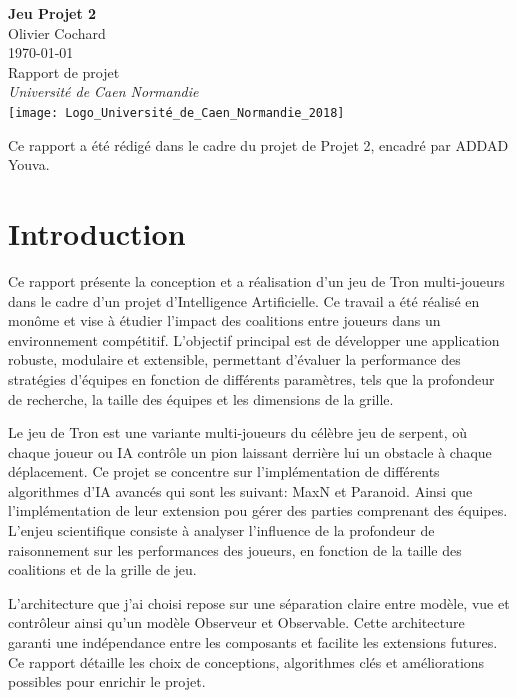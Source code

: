 \documentclass[a4paper,12pt]{article}
\begin{document}
	\begin{titlepage}
		\centering
		{\Huge \textbf{Jeu Projet 2}} \\[1.5cm]
		Olivier Cochard \\
		\today \\[2cm]
		
		
		
		
		{\Large Rapport de projet} \\[0.5cm]
		{\large \textit{Université de Caen Normandie}} \\[2cm]
		\texttt{[image: Logo\_Université\_de\_Caen\_Normandie\_2018]}
		
		
		
		\vfill
		{\small Ce rapport a été rédigé dans le cadre du projet de Projet 2, encadré par ADDAD Youva.}
	\end{titlepage}
	
	
	
\newpage

\tableofcontents
	
\newpage

\section{Introduction}
Ce rapport présente la conception et a réalisation d'un jeu de Tron multi-joueurs dans le cadre d'un projet d'Intelligence Artificielle. Ce travail a été réalisé en monôme et vise à étudier l’impact des coalitions entre joueurs dans un environnement compétitif. L'objectif principal est de développer une application robuste, modulaire et extensible, permettant d’évaluer la performance des stratégies d’équipes en fonction de différents paramètres, tels que la profondeur de recherche, la taille des équipes et les dimensions de la grille.

Le jeu de Tron est une variante multi-joueurs du célèbre jeu de serpent, où chaque joueur ou IA contrôle un pion laissant derrière lui un obstacle à chaque déplacement. Ce projet se concentre sur l’implémentation de différents algorithmes d'IA avancés qui sont les suivant: MaxN et Paranoid. Ainsi que l’implémentation de leur extension pou gérer des parties comprenant des équipes. L’enjeu scientifique consiste à analyser l’influence de la profondeur de raisonnement sur les performances des joueurs, en fonction de la taille des coalitions et de la grille de jeu.

L'architecture que j'ai choisi repose sur une séparation claire entre modèle, vue et contrôleur ainsi qu'un modèle Observeur et Observable. Cette architecture garanti une indépendance entre les composants et facilite les extensions futures.
Ce rapport détaille les choix de conceptions, algorithmes clés et améliorations possibles pour enrichir le projet.
\end{document}

